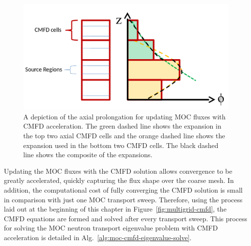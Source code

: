 \begin{figure}[h!] 
	\centering 
	\includegraphics[width=\linewidth]{figures/axial-prolongation.png}
	\caption[]{A depiction of the axial prolongation for updating \ac{MOC} fluxes with \ac{CMFD} acceleration. The green dashed line shows the expansion in the top two axial \ac{CMFD} cells and the orange dashed line shows the expansion used in the bottom two \ac{CMFD} cells. The black dashed line shows the composite of the expansions.}
	\label{fig:axial-prolongation}
\end{figure}

\newpage

Updating the \ac{MOC} fluxes with the \ac{CMFD} solution allows convergence to be greatly accelerated, quickly capturing the flux shape over the coarse mesh. In addition, the computational cost of fully converging the \ac{CMFD} solution is small in comparison with just one \ac{MOC} transport sweep. Therefore, using the process laid out at the beginning of this chapter in Figure~\ref{fig:multigrid-cmfd}, the \ac{CMFD} equations are formed and solved after every transport sweep. This process for solving the \ac{MOC} neutron transport eigenvalue problem with \ac{CMFD} acceleration is detailed in Alg.~\ref{alg:moc-cmfd-eigenvalue-solve}.

